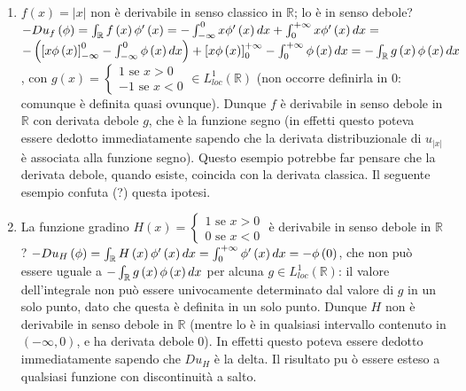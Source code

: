 \documentclass{article}
\begin{document}
\begin{enumerate}
\item $f\left( x\right) =\left\vert x\right\vert $ non \`{e} derivabile in
senso classico in $%
\mathbb{R}
$; lo \`{e} in senso debole? $-Du_{f}\left( \phi \right) =\int_{%
\mathbb{R}
}f\left( x\right) \phi ^{\prime }\left( x\right) =-\int_{-\infty }^{0}x\phi
^{\prime }\left( x\right) dx+\int_{0}^{+\infty }x\phi ^{\prime }\left(
x\right) dx=$ $-\left( \left[ x\phi \left( x\right) \right] _{-\infty
}^{0}-\int_{-\infty }^{0}\phi \left( x\right) dx\right) +\left[ x\phi \left(
x\right) \right] _{0}^{+\infty }-\int_{0}^{+\infty }\phi \left( x\right)
dx=-\int_{%
\mathbb{R}
}g\left( x\right) \phi \left( x\right) dx$, con $g\left( x\right) =\left\{ 
\begin{array}{c}
1\text{ se }x>0 \\ 
-1\text{ se }x<0%
\end{array}%
\right. \in L_{loc}^{1}\left( 
\mathbb{R}
\right) $ (non occorre definirla in $0$: comunque \`{e} definita quasi
ovunque). Dunque $f$ \`{e} derivabile in senso debole in $%
\mathbb{R}
$ con derivata debole $g$, che \`{e} la funzione segno (in effetti questo
poteva essere dedotto immediatamente sapendo che la derivata distribuzionale
di $u_{\left\vert x\right\vert }$ \`{e} associata alla funzione segno).
Questo esempio potrebbe far pensare che la derivata debole, quando esiste,
coincida con la derivata classica. Il seguente esempio confuta (?) questa
ipotesi.

\item La funzione gradino $H\left( x\right) =\left\{ 
\begin{array}{c}
1\text{ se }x>0 \\ 
0\text{ se }x<0%
\end{array}%
\right. $ \`{e} derivabile in senso debole in $%
\mathbb{R}
$? $-Du_{H}\left( \phi \right) =\int_{%
\mathbb{R}
}H\left( x\right) \phi ^{\prime }\left( x\right) dx=\int_{0}^{+\infty }\phi
^{\prime }\left( x\right) dx=-\phi \left( 0\right) $, che non pu\`{o} essere
uguale a $-\int_{%
\mathbb{R}
}g\left( x\right) \phi \left( x\right) dx$ per alcuna $g\in
L_{loc}^{1}\left( 
\mathbb{R}
\right) $: il valore dell'integrale non pu\`{o} essere univocamente
determinato dal valore di $g$ in un solo punto, dato che questa \`{e}
definita in un solo punto. Dunque $H$ non \`{e} derivabile in senso debole
in $%
\mathbb{R}
$ (mentre lo \`{e} in qualsiasi intervallo contenuto in $\left( -\infty
,0\right) $, e ha derivata debole $0$). In effetti questo poteva essere
dedotto immediatamente sapendo che $Du_{H}$ \`{e} la delta. Il risultato pu%
\`{o} essere esteso a qualsiasi funzione con discontinuit\`{a} a salto.
\end{enumerate}
\end{document}
